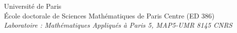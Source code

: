 \documentclass[12pt,a4paper]{article}
\begin{document}
\begin{center}
 {\large\sc Universit\'e de Paris}\\
  \vspace*{0.2cm}
\'Ecole doctorale de Sciences Math\'ematiques de Paris Centre   (ED 386)\\  
 \vspace*{0.4cm} 
{\small \it Laboratoire :  Math\'ematiques Appliqu\'es \`a Paris 5, MAP5-UMR 8145 CNRS } 
\\
 \vspace*{0.2cm} 

\end{center}
\end{document}
